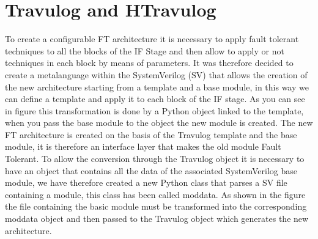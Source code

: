 \chapter{Travulog and HTravulog}{

	To create a configurable FT architecture it is necessary to apply fault tolerant techniques to all the blocks of the IF Stage and then allow to apply or not techniques in each block by means of parameters. It was therefore decided to create a metalanguage within the SystemVerilog (SV) that allows the creation of the new architecture starting from a template and a base module, in this way we can define a template and apply it to each block of the IF stage. As you can see in figure  this transformation is done by a Python object linked to the template, when you pass the base module to the object the new module is created. The new FT architecture is created on the basis of the Travulog template and the base module, it is therefore an interface layer that makes the old module Fault Tolerant. 
	To allow the conversion through the Travulog object it is necessary to have an object that contains all the data of the associated SystemVerilog base module, we have therefore created a new Python class that parses a SV file containing a module, this class has been called moddata. As shown in the figure  the file containing the basic module must be transformed into the corresponding moddata object and then passed to the Travulog object which generates the new architecture.
}
